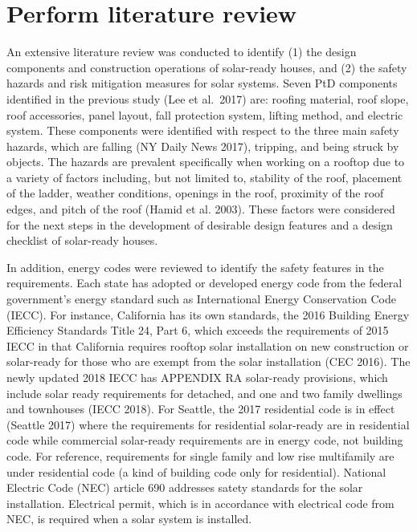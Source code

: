 \documentclass[]{article}
\begin{document}
\hypertarget{perform-literature-review}{%
\section{Perform literature review}\label{perform-literature-review}}

An extensive literature review was conducted to identify (1) the design
components and construction operations of solar-ready houses, and (2)
the safety hazards and risk mitigation measures for solar systems. Seven
PtD components identified in the previous study (Lee et al.~2017) are:
roofing material, roof slope, roof accessories, panel layout, fall
protection system, lifting method, and electric system. These components
were identified with respect to the three main safety hazards, which are
falling (NY Daily News 2017), tripping, and being struck by objects. The
hazards are prevalent specifically when working on a rooftop due to a
variety of factors including, but not limited to, stability of the roof,
placement of the ladder, weather conditions, openings in the roof,
proximity of the roof edges, and pitch of the roof (Hamid et al. 2003).
These factors were considered for the next steps in the development of
desirable design features and a design checklist of solar-ready houses.

In addition, energy codes were reviewed to identify the safety features
in the requirements. Each state has adopted or developed energy code
from the federal government's energy standard such as International
Energy Conservation Code (IECC). For instance, California has its own
standards, the 2016 Building Energy Efficiency Standards Title 24, Part
6, which exceeds the requirements of 2015 IECC in that California
requires rooftop solar installation on new construction or solar-ready
for those who are exempt from the solar installation (CEC 2016). The
newly updated 2018 IECC has APPENDIX RA solar-ready provisions, which
include solar ready requirements for detached, and one and two family
dwellings and townhouses (IECC 2018). For Seattle, the 2017 residential
code is in effect (Seattle 2017) where the requirements for residential
solar-ready are in residential code while commercial solar-ready
requirements are in energy code, not building code. For reference,
requirements for single family and low rise multifamily are under
residential code (a kind of building code only for residential).
National Electric Code (NEC) article 690 addresses satety standards for
the solar installation. Electrical permit, which is in accordance with
electrical code from NEC, is required when a solar system is installed.
\end{document}
